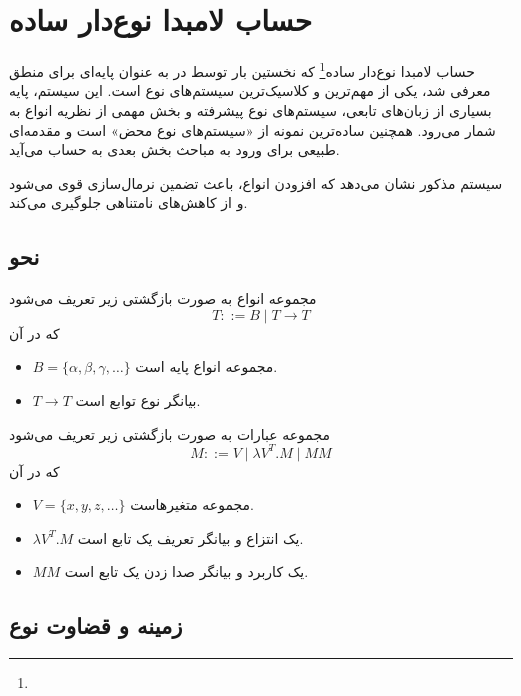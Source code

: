 \section{حساب لامبدا نوع‌دار ساده}

حساب لامبدا نوع‌دار ساده\footnote{}
که نخستین بار توسط
در
\cite{church1940}
به عنوان پایه‌ای برای منطق معرفی شد، یکی از مهم‌ترین و کلاسیک‌ترین سیستم‌های نوع است.
این سیستم، پایه بسیاری از زبان‌های تابعی، سیستم‌های نوع پیشرفته و بخش مهمی از نظریه انواع به شمار می‌رود.
همچنین ساده‌ترین نمونه از «سیستم‌های نوع محض» است و مقدمه‌ای طبیعی برای ورود به مباحث بخش بعدی به حساب می‌آید.

سیستم مذکور نشان می‌دهد که افزودن انواع، باعث تضمین نرمال‌سازی قوی می‌شود و از کاهش‌های نامتناهی جلوگیری می‌کند.

\subsection*{نحو}

\begin{defn}[انواع]
مجموعه انواع به صورت بازگشتی زیر تعریف می‌شود
\begin{equation*}
T ::= B \mid T \to T
\end{equation*}
که در آن
\begin{itemize}
\item $B=\{\alpha,\beta,\gamma,\dots\}$ مجموعه انواع پایه است.
\item $T \to T$ بیانگر نوع توابع است.
\end{itemize}
\end{defn}

\begin{defn}[عبارات]
مجموعه عبارات به صورت بازگشتی زیر تعریف می‌شود
\begin{equation*}
M ::= V \mid \lambda V^T.M \mid MM
\end{equation*}
که در آن
\begin{itemize}
\item $V=\{x,y,z,\dots\}$ مجموعه متغیرهاست.
\item $\lambda V^T.M$ یک انتزاع و بیانگر تعریف یک تابع است.
\item $MM$ یک کاربرد و بیانگر صدا زدن یک تابع است.
\end{itemize}
\end{defn}

\subsection*{زمینه و قضاوت نوع}

